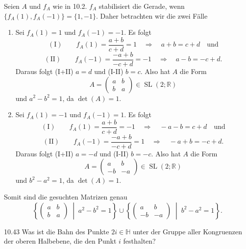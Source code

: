 Seien \(A\) und \(f_A\) wie in 10.2. \(f_A\) stabilisiert die Gerade, wenn \(\{f_A(1), f_A(-1)\} = \{1, -1\}\).
Daher betrachten wir die zwei Fälle
\begin{enumerate}
    \item Sei \(f_A(1)=1\) und \(f_A(-1)=-1\). Es folgt
    \[
        (\text{I}) \qquad f_A(1) = \frac{a+b}{c+d} = 1 \quad \Longrightarrow \quad a+b = c+d \quad \text{und}
    \]
    \[
        (\text{II}) \qquad f_A(-1) = \frac{-a+b}{-c+d} = -1 \quad \Longrightarrow \quad a-b = -c+d.
    \]
    Daraus folgt (I+II) \(a=d\) und (I-II) \(b=c\).
    Also hat \(A\) die Form
    \[
        A= \begin{pmatrix}
            a & b\\
            b & a
        \end{pmatrix} \in \operatorname{SL}(2;\mathbb R)
    \]
    und \(a^2-b^2 = 1\), da \(\det(A) = 1\).
    \item Sei \(f_A(1)=-1\) und \(f_A(-1)=1\). Es folgt
    \[
        (\text{I}) \qquad f_A(1) = \frac{a+b}{c+d} = -1 \quad \Longrightarrow \quad -a-b = c+d \quad \text{und}
    \]
    \[
        (\text{II}) \qquad f_A(-1) = \frac{-a+b}{-c+d} = 1 \quad \Longrightarrow \quad -a+b = -c+d.
    \]
    Daraus folgt (I+II) \(a=-d\) und (I-II) \(b=-c\).
    Also hat \(A\) die Form
    \[
        A= \begin{pmatrix}
            a & b\\
            -b & -a
        \end{pmatrix} \in \operatorname{SL}(2;\mathbb R)
    \]
    und \(b^2-a^2 = 1\), da \(\det(A) = 1\).
    \end{enumerate}
Somit sind die gesuchten Matrizen genau
\[
    \boxed{
    \left\{
        \begin{pmatrix}
            a & b\\
            b & a
        \end{pmatrix}
        \;\middle|\;
        a^2-b^2=1
    \right\}
    \cup
    \left\{
        \begin{pmatrix}
            a & b\\
            -b & -a
        \end{pmatrix}
        \;\middle|\;
        b^2-a^2=1
    \right\}.
    }
\]

\newpage
\begin{exercise}{10.4}{3}
    Was ist die Bahn des Punkte \(2i \in \mathbb H\) unter der Gruppe aller Kongruenzen der oberen Halbebene, die den Punkt \(i\) festhalten?    
\end{exercise}

